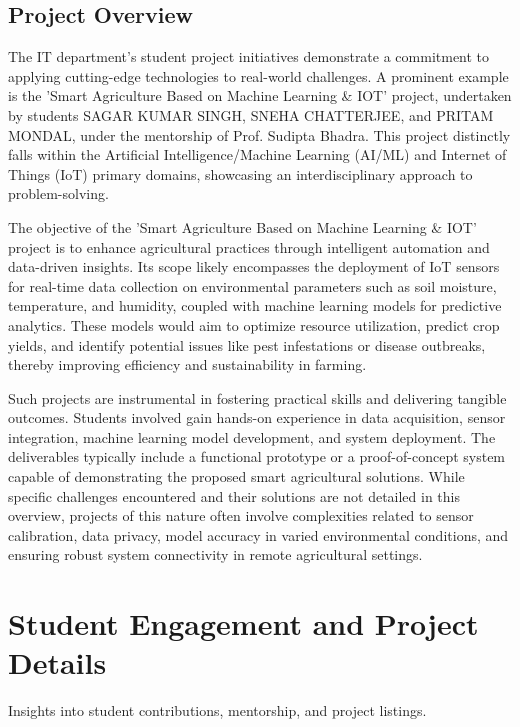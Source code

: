 \documentclass[11pt,a4paper]{article}
\newenvironment{card}{
    \begin{tcolorbox}[
        enhanced,
        colback=cardback,
        colframe=border,
        sharp corners,
        boxrule=0.5pt,
        drop shadow,
        drop shadow={shadow xshift=1mm,shadow yshift=-1mm,fill=border!50},
        boxsep=3mm,
        left=5mm, right=5mm, top=5mm, bottom=5mm,
        width=\textwidth,
        nobeforeafter
    ]
}{\end{tcolorbox}}
\begin{document}
\begin{card}
    \subsection*{\textcolor{accent}{Project Overview}}
    \vspace{0.3cm}
    The IT department's student project initiatives demonstrate a commitment to applying cutting-edge technologies to real-world challenges. A prominent example is the 'Smart Agriculture Based on Machine Learning \& IOT' project, undertaken by students SAGAR KUMAR SINGH, SNEHA CHATTERJEE, and PRITAM MONDAL, under the mentorship of Prof. Sudipta Bhadra. This project distinctly falls within the Artificial Intelligence/Machine Learning (AI/ML) and Internet of Things (IoT) primary domains, showcasing an interdisciplinary approach to problem-solving.

    The objective of the 'Smart Agriculture Based on Machine Learning \& IOT' project is to enhance agricultural practices through intelligent automation and data-driven insights. Its scope likely encompasses the deployment of IoT sensors for real-time data collection on environmental parameters such as soil moisture, temperature, and humidity, coupled with machine learning models for predictive analytics. These models would aim to optimize resource utilization, predict crop yields, and identify potential issues like pest infestations or disease outbreaks, thereby improving efficiency and sustainability in farming.

    Such projects are instrumental in fostering practical skills and delivering tangible outcomes. Students involved gain hands-on experience in data acquisition, sensor integration, machine learning model development, and system deployment. The deliverables typically include a functional prototype or a proof-of-concept system capable of demonstrating the proposed smart agricultural solutions. While specific challenges encountered and their solutions are not detailed in this overview, projects of this nature often involve complexities related to sensor calibration, data privacy, model accuracy in varied environmental conditions, and ensuring robust system connectivity in remote agricultural settings.
\end{card}

\clearpage

\section*{\textcolor{accent}{Student Engagement and Project Details}}
{\large\textcolor{muted}{Insights into student contributions, mentorship, and project listings.}}
\end{document}
